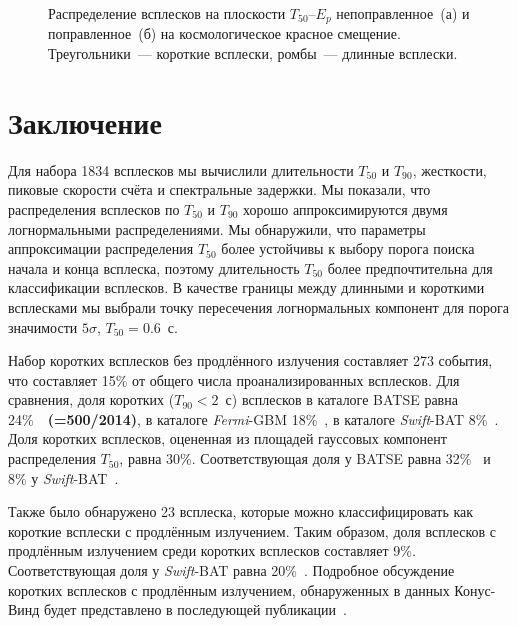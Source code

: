 \begin{figure}[h]
  \begin{minipage}[h]{0.5\textwidth}
  \end{minipage}
  \hfill
  \begin{minipage}[h]{0.5\textwidth}
  \end{minipage}
  \caption{Распределение всплесков на плоскости $T_{50}$--$E_p$ непоправленное~(а) 
  и поправленное~(б) на космологическое красное смещение. 
  Треугольники~--- короткие всплески, ромбы~--- длинные всплески.}
  \label{img:T50EpzCorr}  
\end{figure}
\clearpage

\section{Заключение} \label{sec:Conclision}
Для набора 1834 всплесков мы вычислили длительности $T_{50}$ и $T_{90}$, жесткости, 
пиковые скорости счёта и спектральные задержки. Мы показали, что распределения 
всплесков по $T_{50}$ и $T_{90}$ хорошо аппроксимируются двумя логнормальными 
распределениями. Мы обнаружили, что параметры аппроксимации распределения $T_{50}$ 
более устойчивы к выбору порога поиска начала и конца всплеска, поэтому длительность 
$T_{50}$ более предпочтительна для классификации всплесков. В качестве границы между 
длинными и короткими всплесками мы выбрали точку пересечения логнормальных компонент 
для порога значимости $5\sigma$, $T_{50} = 0.6$~с. 

Набор коротких всплесков без продлённого излучения составляет 273 события, 
что составляет 15\% от общего числа проанализированных всплесков. Для сравнения, 
доля коротких ($T_{90}<2$~с) всплесков в каталоге BATSE равна 24\%~\citep{Meegan_2001}~\textbf{(=500/2014)}, 
в каталоге \textit{Fermi}-GBM 18\%~\citep{Paciesas_2012}, 
в каталоге \textit{Swift}-BAT 8\%~\citep{Sakamoto_2011_2nd_BAT_catalog}. 
Доля коротких всплесков, оцененная из площадей гауссовых компонент 
распределения $T_{50}$, равна 30\%. Соответствующая доля у BATSE равна 32\%~\citep{Horvath_2002} 
и 8\% у \textit{Swift}-BAT~\citep{Horvath_2008}.  

Также было обнаружено 23 всплеска, которые можно классифицировать как короткие 
всплески с продлённым излучением. Таким образом, доля всплесков с продлённым 
излучением среди коротких всплесков составляет 9\%. Соответствующая доля 
у \textit{Swift}-BAT равна 20\%~\citep{Sakamoto_2011_2nd_BAT_catalog}. 
Подробное обсуждение коротких всплесков с продлённым излучением, обнаруженных 
в данных Конус-Винд будет представлено в последующей публикации~\citep{Svinkin_sGRB_EE}.

